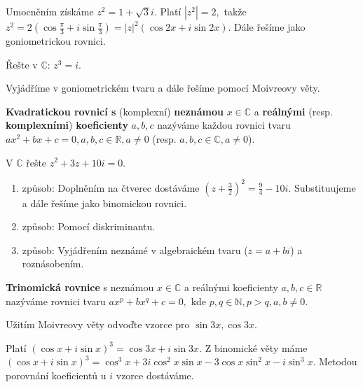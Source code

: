 \begin{reseni}
Umocněním získáme $z^2=1+\sqrt{3}i. $ Platí $|z^2|=2,$ takže $z^2=2(\cos \frac{\pi}{3}+i\sin \frac{\pi}{3})=|z|^2(\cos 2x+i\sin 2x)$.
Dále řešíme jako goniometrickou rovnici.
\end{reseni}

\begin{priklad}
Řešte v $\mathbb C$: $z^3=i.$
\end{priklad}

\begin{reseni}
Vyjádříme v goniometrickém tvaru a dále řešíme pomocí Moivreovy věty.
\end{reseni}

\begin{definition}
\textbf{Kvadratickou rovnicí s} (komplexní) \textbf{neznámou} $x\in \mathbb C$ a
\textbf{reálnými} (resp. \textbf{komplexními}) \textbf{koeficienty} $a,b,c$
nazýváme každou rovnici tvaru
$ax^2+bx+c=0,a,b,c\in \mathbb R,a\ne0$ (resp. $a,b,c \in \mathbb C,a\ne 0$).
\end{definition}

\begin{priklad}
V $\mathbb C$ řešte $z^2+3z+10i=0.$
\end{priklad}

\begin{reseni}
\begin{enumerate}[1.]
\item způsob: Doplněním na čtverec dostáváme $\left ( z+\frac{3}{2} \right )^2=\frac{9}{4}-10i. $
Substituujeme a dále řešíme jako binomickou rovnici.
\item způsob: Pomocí diskriminantu.
\item způsob: Vyjádřením neznámé v algebraickém tvaru ($z=a+bi$) a roznásobením.
\end{enumerate}
\end{reseni}

\begin{definition}
\textbf{Trinomická rovnice} s neznámou $x\in \mathbb C$ a reálnými koeficienty $a,b,c \in \mathbb R$
nazýváme rovnici tvaru $ax^p + bx^q + c = 0,$ kde $p,q\in \mathbb N, p>q, a,b\ne 0.$
\end{definition}

\begin{priklad}
Užitím Moivreovy věty odvoďte vzorce pro $\sin 3x, \cos 3x.$
\end{priklad}

\begin{reseni}
Platí $(\cos x + i\sin x)^3=\cos 3x+i\sin 3x.$ Z binomické věty máme
$(\cos x+i\sin x)^3=\cos^3 x + 3i\cos^2 x\sin x - 3\cos x\sin^2 x-i\sin^3 x.$
Metodou porovnání koeficientů u $i$ vzorce dostáváme.
\end{reseni}
